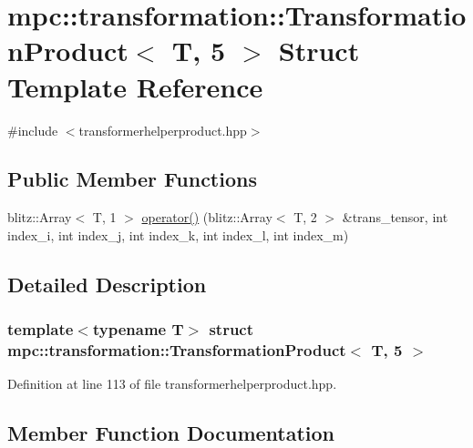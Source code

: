 \hypertarget{structmpc_1_1transformation_1_1_transformation_product_3_01_t_00_015_01_4}{}\section{mpc\+:\+:transformation\+:\+:Transformation\+Product$<$ T, 5 $>$ Struct Template Reference}
\label{structmpc_1_1transformation_1_1_transformation_product_3_01_t_00_015_01_4}


{\ttfamily \#include $<$transformerhelperproduct.\+hpp$>$}

\subsection*{Public Member Functions}
\begin{DoxyCompactItemize}
\item 
blitz\+::\+Array$<$ T, 1 $>$ \mbox{\hyperlink{structmpc_1_1transformation_1_1_transformation_product_3_01_t_00_015_01_4_a81f784bd294547ba3441712fc22713be}{operator()}} (blitz\+::\+Array$<$ T, 2 $>$ \&trans\+\_\+tensor, int index\+\_\+i, int index\+\_\+j, int index\+\_\+k, int index\+\_\+l, int index\+\_\+m)
\end{DoxyCompactItemize}


\subsection{Detailed Description}
\subsubsection*{template$<$typename T$>$\newline
struct mpc\+::transformation\+::\+Transformation\+Product$<$ T, 5 $>$}



Definition at line 113 of file transformerhelperproduct.\+hpp.



\subsection{Member Function Documentation}
\mbox{\label{structmpc_1_1transformation_1_1_transformation_product_3_01_t_00_015_01_4_a81f784bd294547ba3441712fc22713be}} 
